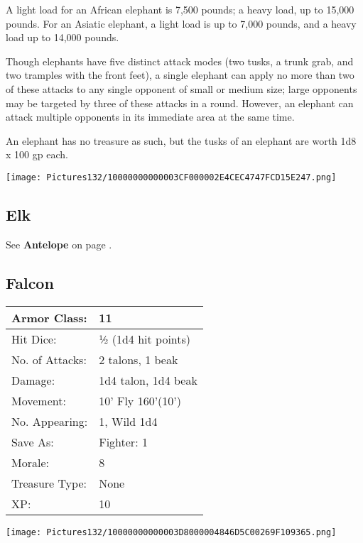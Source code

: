 \documentclass[a4paper,twoside,openany,10pt]{book}
\begin{document}
\begin{multicols}{2}
A light load for an African elephant is 7,500 pounds; a heavy load, up to 15,000 pounds. For an Asiatic elephant, a light load is up to 7,000 pounds, and a heavy load up to 14,000 pounds.

Though elephants have five distinct attack modes (two tusks, a trunk grab, and two tramples with the front feet), a single elephant can apply no more than two of these attacks to any single opponent of small or medium size; large opponents may be targeted by three of these attacks in a round. However, an elephant can attack multiple opponents in its immediate area at the same time.

An elephant has no treasure as such, but the tusks of an elephant are worth 1d8 x 100 gp each.\medskip

\begin{center}
	\texttt{[image: Pictures132/10000000000003CF000002E4CEC4747FCD15E247.png]}
\end{center}

\subsection*{Elk}\label{elk}

See \textbf{Antelope} on page \hyperlink{antelope}{\pageref{antelope}}.

\subsection*{Falcon}\label{falcon}

\begin{tabularx}{0.48\textwidth}{@{}lX@{}}
Armor Class: & 11 \\\hline
Hit Dice: & ½ (1d4 hit points) \\\hline
No. of Attacks: & 2 talons, 1 beak \\\hline
Damage: & 1d4 talon, 1d4 beak \\\hline
Movement: & 10' Fly 160'(10') \\\hline
No. Appearing: & 1, Wild 1d4 \\\hline
Save As: & Fighter: 1 \\\hline
Morale: & 8 \\\hline
Treasure Type: & None \\\hline
XP: & 10 \\\hline
\end{tabularx}\medskip


\begin{center}
	\texttt{[image: Pictures132/10000000000003D8000004846D5C00269F109365.png]}
\end{center}


\end{multicols}
\end{document}
